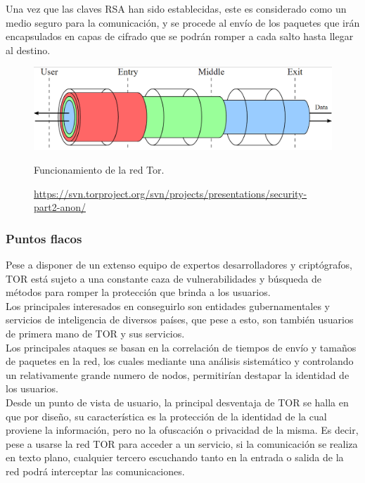 Una vez que las claves RSA han sido establecidas, este es considerado como un medio seguro para la comunicación, y se procede al envío de los paquetes que irán encapsulados en capas de cifrado que se podrán romper a cada salto hasta llegar al destino. \\ 


\begin{figure}[H]
	\centering
	\includegraphics[width=\textwidth]{imagenes/tor_keys}
	\caption{Funcionamiento de la red Tor.}
	\caption*{\small \url {https://svn.torproject.org/svn/projects/presentations/security-part2-anon/}}
	\label{fig:torkeys}
\end{figure}

\subsubsection {Puntos flacos}

Pese a disponer de un extenso equipo de expertos desarrolladores y criptógrafos, TOR está sujeto a una constante caza de vulnerabilidades y búsqueda de métodos para romper la protección que brinda a los usuarios. \\
Los principales interesados en conseguirlo son entidades gubernamentales y servicios de inteligencia de diversos países, que pese a esto, son también usuarios de primera mano de TOR y sus servicios. \\ 

Los principales ataques se basan en la correlación de tiempos de envío y tamaños de paquetes en la red, los cuales mediante una análisis sistemático y controlando un relativamente grande numero de nodos, permitirían destapar la identidad de los usuarios. \\

Desde un punto de vista de usuario, la principal desventaja de TOR se halla en que por diseño, su característica es la protección de la identidad de la cual proviene la información, pero no la ofuscación o privacidad de la misma. Es decir, pese a usarse la red TOR para acceder a un servicio, si la comunicación se realiza en texto plano, cualquier tercero escuchando tanto en la entrada o salida de la red podrá interceptar las comunicaciones. \\ 

